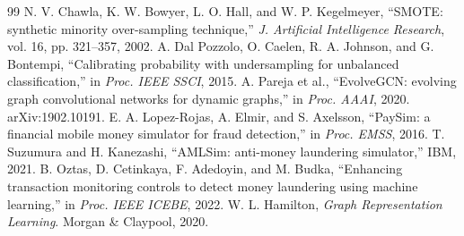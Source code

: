 \documentclass[conference]{IEEEtran}
\begin{document}
\begin{thebibliography}{99}
 N. V. Chawla, K. W. Bowyer, L. O. Hall, and W. P. Kegelmeyer, ``SMOTE: synthetic minority over-sampling technique,'' \textit{J. Artificial Intelligence Research}, vol. 16, pp. 321--357, 2002.
 A. Dal Pozzolo, O. Caelen, R. A. Johnson, and G. Bontempi, ``Calibrating probability with undersampling for unbalanced classification,'' in \textit{Proc. IEEE SSCI}, 2015.
 A. Pareja et al., ``EvolveGCN: evolving graph convolutional networks for dynamic graphs,'' in \textit{Proc. AAAI}, 2020. arXiv:1902.10191.
 E. A. Lopez-Rojas, A. Elmir, and S. Axelsson, ``PaySim: a financial mobile money simulator for fraud detection,'' in \textit{Proc. EMSS}, 2016.
 T. Suzumura and H. Kanezashi, ``AMLSim: anti-money laundering simulator,'' IBM, 2021.
 B. Oztas, D. Cetinkaya, F. Adedoyin, and M. Budka, ``Enhancing transaction monitoring controls to detect money laundering using machine learning,'' in \textit{Proc. IEEE ICEBE}, 2022.
 W. L. Hamilton, \textit{Graph Representation Learning}. Morgan \& Claypool, 2020.
\end{thebibliography}
\end{document}
